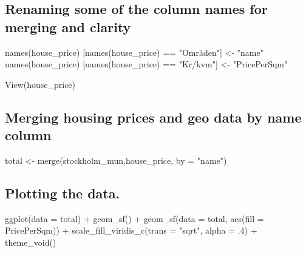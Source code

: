 \documentclass[
]{article}
\newenvironment{Shaded}{\begin{snugshade}}{\end{snugshade}}
\newcommand{\AttributeTok}[1]{\textcolor[rgb]{0.77,0.63,0.00}{#1}}
\newcommand{\DecValTok}[1]{\textcolor[rgb]{0.00,0.00,0.81}{#1}}
\newcommand{\FunctionTok}[1]{\textcolor[rgb]{0.00,0.00,0.00}{#1}}
\newcommand{\NormalTok}[1]{#1}
\newcommand{\OtherTok}[1]{\textcolor[rgb]{0.56,0.35,0.01}{#1}}
\newcommand{\SpecialCharTok}[1]{\textcolor[rgb]{0.00,0.00,0.00}{#1}}
\newcommand{\StringTok}[1]{\textcolor[rgb]{0.31,0.60,0.02}{#1}}
\begin{document}
\hypertarget{renaming-some-of-the-column-names-for-merging-and-clarity}{%
\subsection{Renaming some of the column names for merging and
clarity}\label{renaming-some-of-the-column-names-for-merging-and-clarity}}

\begin{Shaded}
\begin{Highlighting}[]
\FunctionTok{names}\NormalTok{(house\_price) [}\FunctionTok{names}\NormalTok{(house\_price) }\SpecialCharTok{==} \StringTok{"Områden"}\NormalTok{] }\OtherTok{\textless{}{-}} \StringTok{"name"}
\FunctionTok{names}\NormalTok{(house\_price) [}\FunctionTok{names}\NormalTok{(house\_price) }\SpecialCharTok{==} \StringTok{"Kr/kvm"}\NormalTok{] }\OtherTok{\textless{}{-}} \StringTok{"PricePerSqm"}

\FunctionTok{View}\NormalTok{(house\_price)}
\end{Highlighting}
\end{Shaded}

\hypertarget{merging-housing-prices-and-geo-data-by-name-column}{%
\subsection{Merging housing prices and geo data by name
column}\label{merging-housing-prices-and-geo-data-by-name-column}}

\begin{Shaded}
\begin{Highlighting}[]
\NormalTok{total }\OtherTok{\textless{}{-}} \FunctionTok{merge}\NormalTok{(stockholm\_mun,house\_price, }\AttributeTok{by =} \StringTok{"name"}\NormalTok{)}
\end{Highlighting}
\end{Shaded}

\hypertarget{plotting-the-data.}{%
\subsection{Plotting the data.}\label{plotting-the-data.}}

\begin{Shaded}
\begin{Highlighting}[]
\FunctionTok{ggplot}\NormalTok{(}\AttributeTok{data =}\NormalTok{ total) }\SpecialCharTok{+}
  \FunctionTok{geom\_sf}\NormalTok{() }\SpecialCharTok{+}
  \FunctionTok{geom\_sf}\NormalTok{(}\AttributeTok{data =}\NormalTok{ total, }\FunctionTok{aes}\NormalTok{(}\AttributeTok{fill =}\NormalTok{ PricePerSqm)) }\SpecialCharTok{+}
  \FunctionTok{scale\_fill\_viridis\_c}\NormalTok{(}\AttributeTok{trans =} \StringTok{"sqrt"}\NormalTok{, }\AttributeTok{alpha =}\NormalTok{ .}\DecValTok{4}\NormalTok{) }\SpecialCharTok{+}
  \FunctionTok{theme\_void}\NormalTok{()}
\end{Highlighting}
\end{Shaded}
\end{document}
